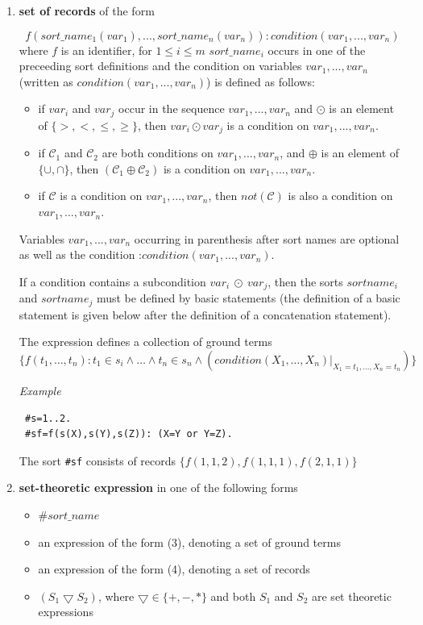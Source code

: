 \documentclass[12pt, letterpaper]{article}
\begin{document}
\begin{enumerate}
\item \textbf{set of records} of the form

\begin{equation*}
f(sort\_name_1(var_1),..., sort\_name_n(var_n)):
                                     condition(var_1,...,var_n)
\end{equation*}
where $f$ is an identifier, for $ 1\leq i\leq m$ $sort\_name_i$ occurs in one of the preceeding sort definitions and  the condition on variables $var_1,...,var_n$ (written as $condition(var_1,...,var_n)$) is defined as follows:
\begin{itemize}
\item if $var_i$ and $var_j$ occur in the sequence  $var_1,...,var_n$ and $\odot$ is an element of $\{>,<,\le,\ge\}$, then $var_i \odot var_j$ is a condition on   $var_1,...,var_n$.
\item if $\mathcal{C}_1$ and $\mathcal{C}_2$ are both conditions on  $var_1,...,var_n$, and $\oplus$ is an element of  $\{\cup,\cap\}$, then
$(\mathcal{C}_1 \oplus \mathcal{C}_2)$ is a condition on  $var_1,...,var_n$.
\item if $\mathcal{C}$ is a  condition on  $var_1,...,var_n$, then $not(\mathcal{C})$ is also a condition on  $var_1,...,var_n$.
\end{itemize}


Variables $var_1,...,var_n$ occurring in parenthesis after sort names are optional as well as the condition :$condition(var_1,...,var_n)$.

If a condition contains a subcondition $var_i~\odot~var_j$,  then the sorts  $sortname_i$ and  $sortname_j$
must be defined by basic statements (the definition of a basic statement is given below after the definition of a concatenation statement).

The expression defines a collection of ground terms 
\\ $\{f(t_1,\dots,t_n):  t_1 \in s_i \land \dots \land t_n \in s_n \land (condition(X_1,\dots, X_n)|_{X_1 = t_1,\dots,X_n = t_n})\}$

\textit{Example}
\begin{verbatim}
 #s=1..2.
 #sf=f(s(X),s(Y),s(Z)): (X=Y or Y=Z). 
\end{verbatim}

The sort \texttt{\#sf} consists of records $\{f(1,1,2),f(1,1,1),f(2,1,1)\}$
 \item \textbf{set-theoretic expression}  in one of the following forms
\begin{itemize}
\item $\#sort\_name$  
\item an expression of the form (3), denoting a set of ground terms
\item an expression of the form (4), denoting a set of records
\item $(S_1 \bigtriangledown S_2)$, where $\bigtriangledown \in \{+,-,*\}$ and both $S_1$ and $S_2$ are set theoretic expressions
\end{itemize}


\end{enumerate}
\end{document}

